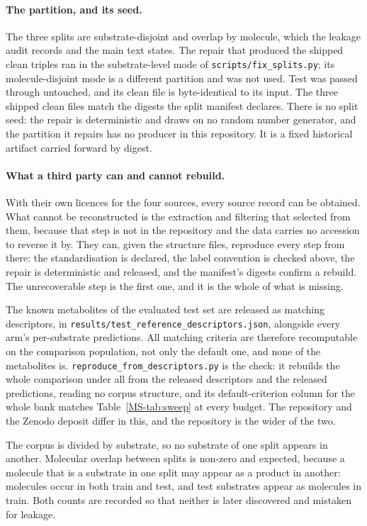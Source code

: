 \documentclass[journal=jcisd8,manuscript=suppinfo,layout=onecolumn]{achemso}
\begin{document}
\paragraph{The partition, and its seed.} The three splits are substrate-disjoint and overlap by
molecule, which the leakage audit records and the main text states. The repair that
produced the shipped clean triples ran in the substrate-level mode of
\texttt{scripts/fix\_splits.py}; its molecule-disjoint mode is a different partition and was not
used. Test was passed through untouched, and its clean file is byte-identical to its input. The
three shipped clean files match the digests the split manifest declares. There is no split seed:
the repair is deterministic and draws on no random number generator, and the partition it repairs
has no producer in this repository. It is a fixed historical artifact carried forward by digest.

\paragraph{What a third party can and cannot rebuild.} With their own licences for the four
sources, every source record can be obtained. What cannot be reconstructed is the extraction and
filtering that selected from them, because that step is not in the repository and the data
carries no accession to reverse it by. They can, given the structure files, reproduce every step
from there: the standardisation is declared, the label convention is checked above, the repair is
deterministic and released, and the manifest's digests confirm a rebuild. The unrecoverable step is
the first one, and it is the whole of what is
missing.

The known metabolites of the evaluated test set are released as matching descriptors, in
\texttt{results/test\_reference\_descriptors.json}, alongside every arm's per-substrate
predictions. All \numCritCriteria{} matching criteria are therefore recomputable on the comparison
population, not only the default one, and none of the metabolites is.
\texttt{reproduce\_from\_descriptors.py} is the check: it rebuilds the whole comparison under all
\numCritCriteria{} from the released descriptors and the released predictions, reading no corpus
structure, and its default-criterion column for the whole bank matches Table~\ref{MS-tab:sweep} at
every budget. The repository and the Zenodo deposit differ in this, and the repository is the wider
of the two.

The corpus is divided by substrate, so no substrate of one split appears in another. Molecular
overlap between splits is non-zero and expected, because a molecule
that is a substrate in one split may appear as a product in another: \numLeakMolOverlap{}
molecules occur in both train and test, and \numLeakSubAsMol{} test substrates appear as molecules
in train. Both counts are recorded so that neither is later discovered and mistaken for leakage.
\end{document}
